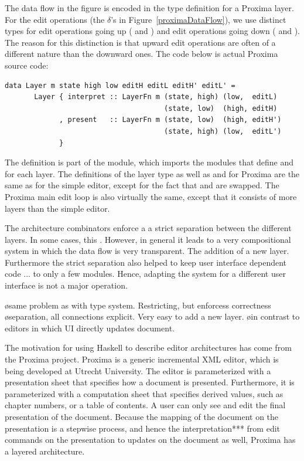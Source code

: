 \documentclass{llncs}
\begin{document}
The data flow in the figure is encoded in the type definition for a Proxima layer. For the edit operations (the $\delta$'s in Figure~\ref{proximaDataFlow}), we use distinct types for edit operations going up ( and ) and edit operations going down ( and ). The reason for this distinction is that upward edit operations are often of a different nature than the downward ones. The code below is actual Proxima source code:

\begin{small}
\begin{verbatim}
data Layer m state high low editH editL editH' editL' =
       Layer { interpret :: LayerFn m (state, high) (low,  editL)
                                      (state, low)  (high, editH)
             , present   :: LayerFn m (state, low)  (high, editH')
                                      (state, high) (low,  editL')
             }
\end{verbatim}
\end{small}

The  definition is part of the  module, which imports the modules that define  and  for each layer. The definitions of the layer type as well as  and  for Proxima are the same as for the simple editor, except for the fact that  and  are swapped. The Proxima main edit loop is also virtually the same, except that it consists of more layers than the simple editor.


\bc
\bigskip

The architecture combinators enforce a a strict separation between the different layers. In some cases, this . However, in general it leads to a very compositional system in which the data flow is very transparent. The addition of a new layer. Furthermore the strict separation also helped to keep user interface dependent code ... to only a few modules. Hence, adapting the system for a different user interface is not a major operation.

\bl
\o same problem as with type system. Restricting, but enforcess correctness
\o separation, all connections explicit. Very easy to add a new layer. 
\o in contrast to editors in which UI directly updates document.
\el
\ec

\bc
The motivation for using Haskell to describe editor architectures has come from the Proxima project. Proxima is a generic incremental XML editor, which is being developed at Utrecht University. The editor is parameterized with a presentation sheet that specifies how a document is presented. Furthermore, it is parameterized with a computation sheet that specifies derived values, such as chapter numbers, or a table of contents. A user can only see and edit the final presentation of the document. Because the mapping of the document on the presentation is a stepwise process, and hence the interpretation*** from edit commands on the presentation to updates on the document as well, Proxima has a layered architecture.
\ec
\end{document}

